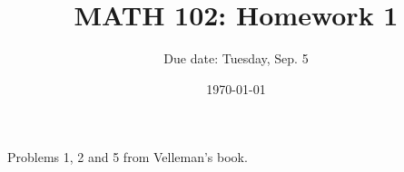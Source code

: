 \documentclass[12pt]{amsart}
\title{ MATH 102: Homework 1}
\author{Due date: Tuesday, Sep. 5}
\date{\today}
\begin{document}
\maketitle

Problems 1, 2 and 5 from Velleman's book.



\printbibliography 
%
%
\end{document}
